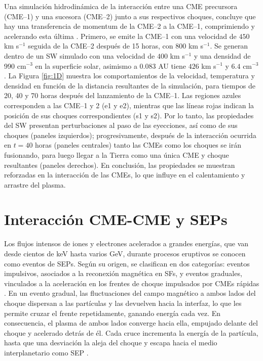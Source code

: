 Una simulación hidrodinámica de la interacción entre una CME precursora (CME--1) y una sucesora (CME--2) junto a sus respectivos choques, concluye que hay una transferencia de momentum de la CME--2 a la CME--1, comprimiendo y acelerando esta última \parencite[][]{gonzalez-esparza-2004}. Primero, se emite la CME--1 con una velocidad de $450$ km s$^{-1}$ seguida de la CME--2 después de 15 horas, con $800$ km s$^{-1}$. Se generan dentro de un \ac{SW} simulado con una velocidad de $400$ km s$^{-1}$ y una densidad de 990 cm$^{-3}$ en la superficie solar, asimismo a 0.083 AU tiene $426$ km s$^{-1}$ y $6.4$ cm$^{-3}$. La Figura \ref{fig:1D} muestra los comportamientos de la velocidad, temperatura y densidad en función de la distancia resultantes de la simulación, para tiempos de 20, 40 y 70 horas después del lanzamiento de la CME--1. Las regiones azules corresponden a las CME--1 y 2 (e1 y e2), mientras que las líneas rojas indican la posición de sus choques correspondientes (s1 y s2). Por lo tanto, las propiedades del \ac{SW} presentan perturbaciones al paso de las eyecciones, así como de sus choques (paneles izquierdos); progresivamente, después de la interacción ocurrida en $t=40$ horas (paneles centrales) tanto las CMEs como los choques se irán fusionando, para luego llegar a la Tierra como una única CME y choque resultantes (paneles derechos). En conclusión, las propiedades se muestran reforzadas en la interacción de las CMEs, lo que influye en el calentamiento y arrastre del plasma.

\section{Interacción CME-CME y SEPs}
\label{CMESEPs}

Los flujos intensos de iones y electrones acelerados a grandes energías, que van desde cientos de keV hasta varios GeV, durante procesos eruptivos se conocen como eventos de \acp{SEP}. Según su origen, se clasifican en dos categorías: eventos impulsivos, asociados a la reconexión magnética en \acp{SF}, y eventos graduales, vinculados a la aceleración en los frentes de choque impulsados por \acp{CME} rápidas \parencite[e.g.,][]{reames-2013, anastasiadis-2019, vlahos-2019}. En un evento gradual, las fluctuaciones del campo magnético a ambos lados del choque dispersan a las partículas y las devuelven hacia la interfaz, lo que les permite cruzar el frente repetidamente, ganando energía cada vez. En consecuencia, el plasma de ambos lados converge hacia ella, empujado delante del choque y acelerado detrás de él. Cada cruce incrementa la energía de la partícula, hasta que una desviación la aleja del choque y escapa hacia el medio interplanetario como \ac{SEP} \parencite{reames-1999, desai-2016}.


